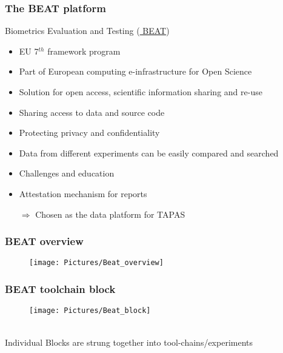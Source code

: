 \documentclass[xcolor=dvipsnames]{beamer}
\begin{document}
\begin{frame}
	\frametitle{The BEAT platform \hspace{7cm} {\scriptsize\cite{anjos2017beat}}}
	
	\begin{block}{Biometrics Evaluation and Testing (\href{https://www.beat-eu.org/platform/}{\color{blue} BEAT}) \hspace{3.5cm} {\scriptsize\cite{BEATweb}}}
	\begin{itemize}
	\item EU 7$^{th}$ framework program
	\item Part of European computing e-infrastructure for Open Science
	\item Solution for open access, scientific information sharing and re-use
	\item Sharing access to data and source code
	\item Protecting privacy and confidentiality
	\item Data from different experiments can be easily compared and searched
	\item Challenges and education
	\item Attestation mechanism for reports
	\item[$\Rightarrow$] {\color{Maroon}Chosen as the data platform for TAPAS}
	\end{itemize}
	\end{block}	
	
	
	\let\thefootnote\relax{}
\end{frame}

\begin{frame}
	\frametitle{BEAT overview}
		
	\begin{center}
	\begin{figure}[l]
     \texttt{[image: Pictures/Beat\_overview]}
	\end{figure}
	\end{center}
\end{frame}


\begin{frame}
	\frametitle{BEAT toolchain block}
		
	\begin{center}
	\begin{figure}[l]
     \texttt{[image: Pictures/Beat\_block]}
	\end{figure}
	~\\
	Individual Blocks are strung together into tool-chains/experiments
	\end{center}
\end{frame}
\end{document}
